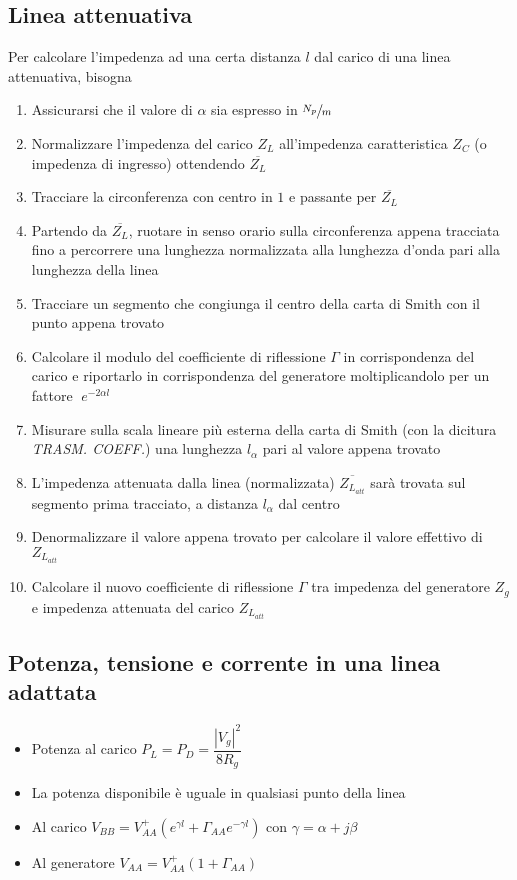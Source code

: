 \documentclass{article}
\begin{document}
\subsection{Linea attenuativa}
Per calcolare l'impedenza ad una certa distanza \(l\) dal carico di una linea attenuativa, bisogna
\begin{enumerate}
	\item Assicurarsi che il valore di \(\alpha\) sia espresso in \(\sfrac{N_p}{m}\)
	\item Normalizzare l'impedenza del carico \(Z_L\) all'impedenza caratteristica \(Z_C\) (o impedenza di ingresso) ottendendo \(\overline{Z_L}\)
	\item Tracciare la circonferenza con centro in \(1\) e passante per \( \overline{Z_L} \)
	\item Partendo da \(\overline{Z_L}\), ruotare in senso orario sulla circonferenza appena tracciata fino a percorrere una lunghezza normalizzata alla lunghezza d'onda pari alla lunghezza della linea
	\item Tracciare un segmento che congiunga il centro della carta di Smith con il punto appena trovato
	\item Calcolare il modulo del coefficiente di riflessione \(\Gamma\) in corrispondenza del carico e riportarlo in corrispondenza del generatore moltiplicandolo per un fattore \(\;e^{-2 \alpha l}\)
	\item Misurare sulla scala lineare più esterna della carta di Smith (con la dicitura \textit{TRASM. COEFF.}) una lunghezza \(l_\alpha\) pari al valore appena trovato
	\item L'impedenza attenuata dalla linea (normalizzata) \(\displaystyle \overline{Z_{L_{att}}}\) sarà trovata sul segmento prima tracciato, a distanza \( l_\alpha\) dal centro
	\item Denormalizzare il valore appena trovato per calcolare il valore effettivo di \( Z_{L_{att}} \)
	\item Calcolare il nuovo coefficiente di riflessione \(\Gamma\) tra impedenza del generatore \(Z_g\) e impedenza attenuata del carico \(Z_{L_{att}}\)

\end{enumerate}

\subsection{Potenza, tensione e corrente in una linea adattata}
\begin{itemize}
	\item Potenza al carico \(P_L = P_D = \dfrac{|V_g|^2}{8 R_g} \)
	\item La potenza disponibile è uguale in qualsiasi punto della linea
	\item Al carico \(V_{BB} = V_{AA}^+ \left( e ^ {\gamma l} + \Gamma_{AA} e^{-\gamma l} \right) \) con \(\gamma = \alpha + j \beta \)
	\item Al generatore \( V_{AA} = V_{AA}^+ \left( 1 + \Gamma_{AA} \right) \)
\end{itemize}
\end{document}

